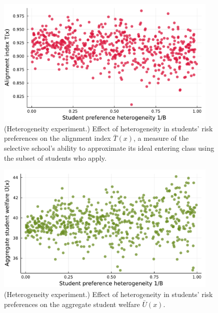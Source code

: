 \documentclass[12pt]{article} %
\theoremstyle{definition}
\theoremstyle{definition}
\begin{document}
\begin{figure}[h!]
  \begin{center}\includegraphics[width=0.95\textwidth]{./TwoSchoolModels/CombiPref-complementarity/heterogeneity-T.pdf}\end{center}
  \caption{(Heterogeneity experiment.) Effect of heterogeneity in students' risk preferences on the alignment index $\bar T(x)$, a measure of the selective school's ability to approximate its ideal entering class using the subset of students who apply. }
\end{figure}

\begin{figure}[h!]
  \begin{center}\includegraphics[width=0.95\textwidth]{./TwoSchoolModels/CombiPref-complementarity/heterogeneity-U.pdf}\end{center}
  \caption{(Heterogeneity experiment.) Effect of heterogeneity in students' risk preferences on the aggregate student welfare $\bar U(x)$.}
\end{figure}
\end{document}

